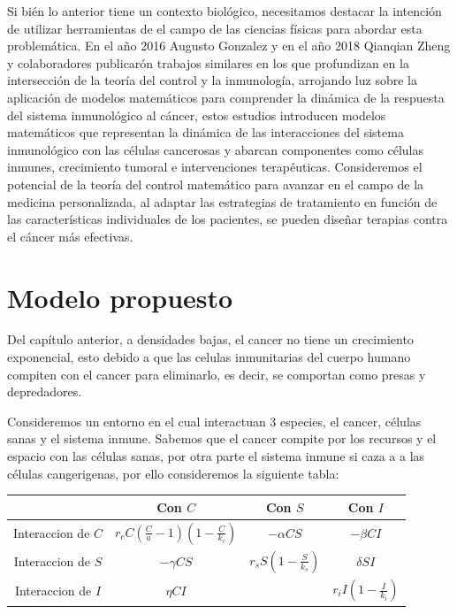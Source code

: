 \documentclass{article}
\begin{document}
Si bién lo anterior tiene un contexto biológico, necesitamos destacar la intención de utilizar herramientas de el campo de las ciencias físicas para abordar esta problemática. En el año 2016 Augusto Gonzalez \cite{Gonzalez2016} y en el año 2018 Qianqian Zheng y colaboradores \cite{Zheng2018} publicarón trabajos similares en los que profundizan en la intersección de la teoría del control y la inmunología, arrojando luz sobre la aplicación de modelos matemáticos para comprender la dinámica de la respuesta del sistema inmunológico al cáncer, estos estudios introducen modelos matemáticos que representan la dinámica de las interacciones del sistema inmunológico con las células cancerosas y abarcan componentes como células inmunes, crecimiento tumoral e intervenciones terapéuticas. Consideremos el potencial de la teoría del control matemático para avanzar en el campo de la medicina personalizada, al adaptar las estrategias de tratamiento en función de las características individuales de los pacientes, se pueden diseñar terapias contra el cáncer más efectivas.


 \newpage



\section{Modelo propuesto}

Del capítulo anterior, a densidades bajas, el cancer no tiene un crecimiento exponencial, esto debido a que las celulas inmunitarias del cuerpo humano compiten con el cancer para eliminarlo, es decir, se comportan como presas y depredadores.


Consideremos un entorno en el cual interactuan 3 especies, el cancer, células sanas y el sistema inmune. Sabemos que el cancer compite por los recursos y el espacio con las células sanas, por otra parte el sistema inmune si caza a a las células cangerigenas, por ello consideremos la siguiente tabla:

\begin{table}[h]
\begin{center}
\begin{tabular}{ | c | c | c | c | }
\hline  & Con $C$ & Con $S$ & Con $I$ \\ \hline
Interaccion de $C$ & $r_c C (\frac{C}{a} - 1)(1-\frac{C}{k_c})$ & $-\alpha CS$ & $-\beta CI$  \\ \hline
Interaccion de $S$ & $-\gamma CS$ & $r_s S (1 - \frac{S}{k_s})$  & $\delta SI$  \\ \hline
Interaccion de $I$ & $\eta C I$ &   & $r_i I(1-\frac{I}{k_i})$  \\ \hline

\end{tabular}
\end{center}
\end{table}
 
\end{document}

